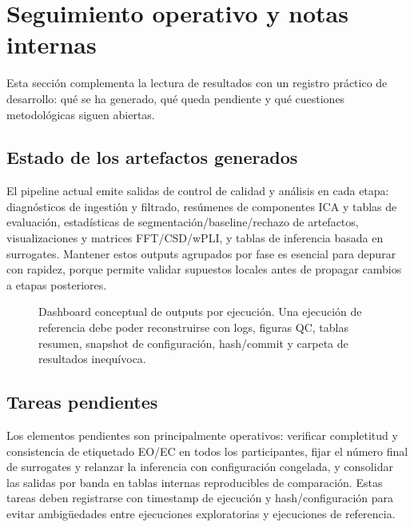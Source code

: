 \section{Seguimiento operativo y notas internas}

Esta sección complementa la lectura de resultados con un registro práctico de desarrollo: qué se ha generado, qué queda pendiente y qué cuestiones metodológicas siguen abiertas.

\subsection{Estado de los artefactos generados}

El pipeline actual emite salidas de control de calidad y análisis en cada etapa: diagnósticos de ingestión y filtrado, resúmenes de componentes ICA y tablas de evaluación, estadísticas de segmentación/baseline/rechazo de artefactos, visualizaciones y matrices FFT/CSD/wPLI, y tablas de inferencia basada en surrogates. Mantener estos outputs agrupados por fase es esencial para depurar con rapidez, porque permite validar supuestos locales antes de propagar cambios a etapas posteriores.

\begin{fullwidth}
\begin{figure}[H]
\centering
\resizebox{0.74\fulltextwidth}{!}{\NSOutputsDashboard}
\caption{Dashboard conceptual de outputs por ejecución. Una ejecución de referencia debe poder reconstruirse con logs, figuras QC, tablas resumen, snapshot de configuración, hash/commit y carpeta de resultados inequívoca.}
\label{fig:generated-outputs-dashboard}
\end{figure}
\end{fullwidth}

\subsection{Tareas pendientes}

Los elementos pendientes son principalmente operativos: verificar completitud y consistencia de etiquetado EO/EC en todos los participantes, fijar el número final de surrogates y relanzar la inferencia con configuración congelada, y consolidar las salidas por banda en tablas internas reproducibles de comparación. Estas tareas deben registrarse con timestamp de ejecución y hash/configuración para evitar ambigüedades entre ejecuciones exploratorias y ejecuciones de referencia.

